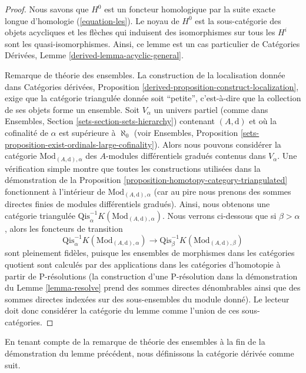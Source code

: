 \begin{proof}
Nous savons que $H^0$ est un foncteur homologique par la suite exacte longue
d'homologie (\ref{equation-les}). Le noyau de $H^0$ est la sous-catégorie des
objets acycliques et les flèches qui induisent des isomorphismes sur tous les
$H^i$ sont les quasi-isomorphismes. Ainsi, ce lemme est un cas particulier de
Catégories Dérivées, Lemme \ref{derived-lemma-acyclic-general}.

\medskip\noindent
Remarque de théorie des ensembles. La construction de la localisation donnée dans
Catégories dérivées, Proposition \ref{derived-proposition-construct-localization},
exige que la catégorie triangulée donnée soit ``petite'', c'est-à-dire que
la collection de ses objets forme un ensemble. Soit $V_\alpha$ un univers
partiel (comme dans Ensembles, Section \ref{sets-section-sets-hierarchy})
contenant $(A, \text{d})$ et où la cofinalité de $\alpha$ est supérieure à
$\aleph_0$ (voir Ensembles, Proposition
\ref{sets-proposition-exist-ordinals-large-cofinality}). Alors nous pouvons
considérer la catégorie $\text{Mod}_{(A, \text{d}), \alpha}$ des $A$-modules
différentiels gradués contenus dans $V_\alpha$. Une vérification simple montre que
toutes les constructions utilisées dans
la démonstration de la Proposition
\ref{proposition-homotopy-category-triangulated} fonctionnent à l'intérieur de
$\text{Mod}_{(A, \text{d}), \alpha}$ (car au pire nous prenons des sommes directes
finies de modules différentiels gradués). Ainsi, nous obtenons une catégorie
triangulée $\text{Qis}_\alpha^{-1}K(\text{Mod}_{(A, \text{d}), \alpha})$. Nous
verrons ci-dessous que si $\beta > \alpha$, alors les foncteurs de transition
$$
\text{Qis}_\alpha^{-1}K(\text{Mod}_{(A, \text{d}), \alpha})
\longrightarrow
\text{Qis}_\beta^{-1}K(\text{Mod}_{(A, \text{d}), \beta})
$$
sont pleinement fidèles, puisque les ensembles de morphismes dans les catégories
quotient sont calculés par des applications dans les catégories d’homotopie à
partir de P-résolutions (la construction d’une P-résolution dans la démonstration
du Lemme \ref{lemma-resolve} prend des sommes directes dénombrables ainsi que des
sommes directes indexées sur des sous-ensembles du module donné). Le lecteur doit
donc considérer la catégorie du lemme comme l’union de ces sous-catégories.
\end{proof}

\noindent
En tenant compte de la remarque de théorie des ensembles à la fin de la
démonstration du lemme précédent, nous définissons la catégorie dérivée comme
suit.

